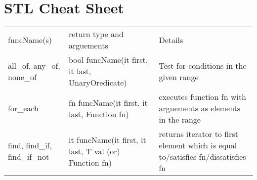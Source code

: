 \section{STL Cheat Sheet}



\begin{tabular}{l|l|l}
	funcName(s)	&	return type and arguements	&	Details	\\
	all\_of, any\_of, none\_of	& bool funcName(it first, it last, UnaryOredicate)	&	Test for conditions in the given range	\\
	for\_each 	&	fn funcName(it first, it last, Function fn) &	executes function fn with arguements as elements in the range \\
	find, find\_if, find\_if\_not	&	it funcName(it first, it last, T val (or) Function fn)	&	returns iterator to first element which is equal to/satisfies fn/dissatisfies fn \\

\end{tabular}